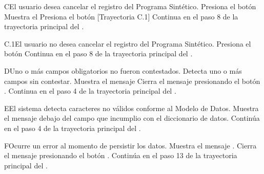 \begin{UCtrayectoriaA}{C}{El usuario desea cancelar el registro del Programa Sintético.}
\UCpaso[\UCactor] Presiona el botón 
\UCpaso Muestra el 
\UCpaso[\UCactor] Presiona el botón  [Trayectoria C.1]
\UCpaso Continua en el paso 8 de la trayectoria principal del .
\end{UCtrayectoriaA}

\begin{UCtrayectoriaA}{C.1}{El usuario no desea cancelar el registro del Programa Sintético.}
\UCpaso[\UCactor] Presiona el botón 
\UCpaso Continua en el paso 8 de la trayectoria principal del .
\end{UCtrayectoriaA}

\begin{UCtrayectoriaA}{D}{Uno o más campos obligatorios no fueron contestados.}
\UCpaso Detecta uno o más campos sin contestar.
\UCpaso Muestra el mensaje 
\UCpaso[\UCactor] Cierra el mensaje presionando el botón .
\UCpaso Continua en el paso 4 de la trayectoria principal del .
\end{UCtrayectoriaA}

\begin{UCtrayectoriaA}{E}{El sistema detecta caracteres no válidos conforme al Modelo de Datos.}
	\UCpaso Muestra el mensaje  debajo del campo que incumplio con el diccionario de datos.
	\UCpaso Continúa en el paso 4 de la trayectoria principal del .
\end{UCtrayectoriaA}

\begin{UCtrayectoriaA}{F}{Ocurre un error al momento de persistir los datos.}
	\UCpaso Muestra el mensaje .
	\UCpaso[\UCactor] Cierra el mensaje presionando el botón .
	\UCpaso Continúa en el paso 13 de la trayectoria principal del .
\end{UCtrayectoriaA}